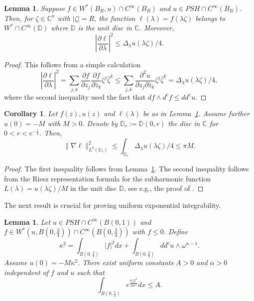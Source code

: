 \documentclass{amsart}
\renewcommand{\d}{\partial}
\newcommand{\al}{\alpha}
\newcommand{\ze}{\zeta}
\newcommand{\la}{\lambda}
\newcommand{\om}{\omega}
\newcommand{\ka}{\kappa}
\newcommand{\De}{\Delta}
\newcommand{\na}{\nabla}
\newcommand{\bD}{\mathbb{D}}
\newcommand{\bC}{\mathbb{C}}
\newtheorem{lem}[thm]{Lemma}
\newtheorem{cor}[thm]{Corollary}
\theoremstyle{definition}
\numberwithin{thm}{section}
\numberwithin{equation}{section}
\renewcommand{\[}{\begin{equation}}
\renewcommand{\]}{\end{equation}}
\newcommand{\wed}{\wedge}
\begin{document}
\begin{lem} \label{lem:restriction} Suppose $f \in W^*(B_R, u) \cap C^\infty(B_R)$ and $u\in PSH\cap C^\infty(B_R)$. Then, for $\ze \in \bC^n$ with $|\ze| =R$,   the function $\ell (\la) = f(\la \ze)$ belongs to $W^*\cap C^\infty(\bD)$ where $\bD$ is the unit disc in $ \bC$. Moreover,
$$
	\left| \frac{\d \ell}{\d \la} \right|^2 \leq  \De_\la u(\la \ze)/4.
$$
\end{lem}

\begin{proof} This follows from a simple calculation
$$
	\left|\frac{\d\ell }{\d \la}\right|^2 = \sum_{j,k} \frac{\d f}{\d z_j} \frac{\d f}{\d \bar z_k} \ze^j \bar \ze^k \leq \sum_{j,k}\frac{\d^2 u}{\d z_j \d \bar z_k} \ze^j \bar \ze^k = \De_\la u(\la \ze) /4,
$$
where the second inequality used the fact that $df\wed d^c f\leq dd^c u$.
\end{proof}


\begin{cor} \label{cor:grad-1d} Let $f(z), u(z)$  and $\ell (\la)$ be as in Lemma~\ref{lem:restriction}. Assume further  $u(0)=-M$ with $M>0$. Denote by $\bD_r:= \bD(0,r)$ the disc in $\bC$ for $0<r<e^{-\frac{1}{2}}$. Then, 
$$
	\|\na \ell \|^2_{L^2(\bD_r)} \leq \int_{\bD_r}  \De_\la u (\la \ze)/4 \leq \pi M.
$$
\end{cor}

\begin{proof} The first inequality follows from Lemma~\ref{lem:restriction}. The second inequality follows from the Riesz representation formula for the subharmonic function $L (\la) = u(\la\ze)/M$ in the unit disc $\bD$, see e.g., the proof of  \cite[Proposition~4.2.9]{Ho07}. 
\end{proof}

The next result is  crucial for proving uniform exponential integrability.

\begin{lem} \label{lem:exp-est-key} Let $u\in PSH \cap C^\infty (B(0,1))$ and $f\in W^*(u, B(0,\frac{3}{4}))\cap C^\infty(B(0,\frac{3}{4}))$ with $f\leq 0$. Define
$$
	\ka^2 = \int_{B(0,\frac{3}{4})} |f|^2 dx + \int_{B(0,\frac{3}{4})} dd^c u \wed \om^{n-1}.
$$ Assume $u(0)=-M \ka^2$. There exist uniform constants $A>0$ and $\al>0$ independent of $f$ and $u$ such that 
$$\int_{B(0,\frac{1}{2})} e^{ \frac{\al |f|^2}{M \ka^2}} dx  \leq A.$$ 
\end{lem}
\end{document}

